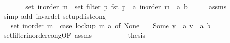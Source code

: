 \begin{isabellebody}
\ \ \isamarkupfalse%
\ \isamarkupfalse%
\ {\isachardoublequoteopen}{\isachardot}{\kern0pt}{\isachardot}{\kern0pt}{\isachardot}{\kern0pt}\ {\isacharequal}{\kern0pt}\ set\ {\isacharparenleft}{\kern0pt}inorder\ m{\isacharparenright}{\kern0pt}\ {\isacharminus}{\kern0pt}\ set\ {\isacharparenleft}{\kern0pt}filter\ {\isacharparenleft}{\kern0pt}{\isasymlambda}p{\isachardot}{\kern0pt}\ fst\ p\ {\isacharequal}{\kern0pt}\ a{\isacharparenright}{\kern0pt}\ {\isacharparenleft}{\kern0pt}inorder\ m{\isacharparenright}{\kern0pt}{\isacharparenright}{\kern0pt}\ {\isasymunion}\ {\isacharbraceleft}{\kern0pt}{\isacharparenleft}{\kern0pt}a{\isacharcomma}{\kern0pt}\ b{\isacharparenright}{\kern0pt}{\isacharbraceright}{\kern0pt}{\isachardoublequoteclose}\isanewline
\ \ \ \ \isamarkupfalse%
\ assms\isanewline
\ \ \ \ \isamarkupfalse%
\ {\isacharparenleft}{\kern0pt}simp\ add{\isacharcolon}{\kern0pt}\ invar{\isacharunderscore}{\kern0pt}def\ set{\isacharunderscore}{\kern0pt}upd{\isacharunderscore}{\kern0pt}list{\isacharunderscore}{\kern0pt}cong{\isacharparenright}{\kern0pt}\isanewline
\ \ \isamarkupfalse%
\ \isamarkupfalse%
\ {\isachardoublequoteopen}{\isachardot}{\kern0pt}{\isachardot}{\kern0pt}{\isachardot}{\kern0pt}\ {\isacharequal}{\kern0pt}\ set\ {\isacharparenleft}{\kern0pt}inorder\ m{\isacharparenright}{\kern0pt}\ {\isacharminus}{\kern0pt}\ {\isacharparenleft}{\kern0pt}case\ lookup\ m\ a\ of\ None\ {\isasymRightarrow}\ {\isacharbraceleft}{\kern0pt}{\isacharbraceright}{\kern0pt}\ {\isacharbar}{\kern0pt}\ Some\ y\ {\isasymRightarrow}\ {\isacharbraceleft}{\kern0pt}{\isacharparenleft}{\kern0pt}a{\isacharcomma}{\kern0pt}\ y{\isacharparenright}{\kern0pt}{\isacharbraceright}{\kern0pt}{\isacharparenright}{\kern0pt}\ {\isasymunion}\ {\isacharbraceleft}{\kern0pt}{\isacharparenleft}{\kern0pt}a{\isacharcomma}{\kern0pt}\ b{\isacharparenright}{\kern0pt}{\isacharbraceright}{\kern0pt}{\isachardoublequoteclose}\isanewline
\ \ \ \ \isamarkupfalse%
\ set{\isacharunderscore}{\kern0pt}filter{\isacharunderscore}{\kern0pt}inorder{\isacharunderscore}{\kern0pt}cong{\isacharbrackleft}{\kern0pt}OF\ assms{\isacharbrackright}{\kern0pt}\isanewline
\ \ \ \ \isacommand{{\isachardot}{\kern0pt}{\isachardot}{\kern0pt}}\isamarkupfalse%
\isanewline
\ \ \isamarkupfalse%
\ \isamarkupfalse%
\ {\isacharquery}{\kern0pt}thesis\isanewline
\ \ \ \ \isacommand{{\isachardot}{\kern0pt}}\isamarkupfalse%
\isanewline
{}\isamarkupfalse%
%
\endisatagproof
{\isafoldproof}%

\end{isabellebody}
